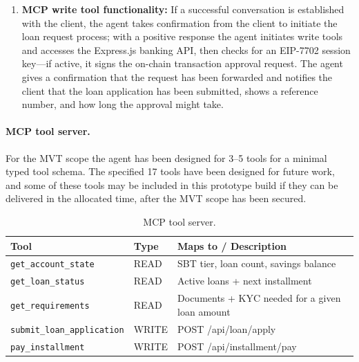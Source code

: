 \documentclass[12pt,a4paper]{report}
\newcommand{\tableheadcolor}{\rowcolor{TableHeadBg}}
\begin{document}
\begin{enumerate}[noitemsep]
\item \textbf{MCP write tool functionality:} If a successful conversation is established with the client, the agent takes confirmation from the client to initiate the loan request process; with a positive response the agent initiates write tools and accesses the Express.js banking API, then checks for an EIP-7702 session key---if active, it signs the on-chain transaction approval request. The agent gives a confirmation that the request has been forwarded and notifies the client that the loan application has been submitted, shows a reference number, and how long the approval might take.
\end{enumerate}

\paragraph{MCP tool server.} For the MVT scope the agent has been designed for 3--5 tools for a minimal typed tool schema. The specified 17 tools have been designed for future work, and some of these tools may be included in this prototype build if they can be delivered in the allocated time, after the MVT scope has been secured.

\begin{table}[H]
\centering
\caption[MCP tool server]{MCP tool server.}
\label{tab:mcp-tools}
\begin{tabular}{p{4.8cm}p{1.4cm}p{6.3cm}}
\toprule
\tableheadcolor
\textbf{Tool} & \textbf{Type} & \textbf{Maps to / Description} \\
\midrule
\texttt{get\_account\_state}       & READ & SBT tier, loan count, savings balance \\
\texttt{get\_loan\_status}         & READ & Active loans + next installment \\
\texttt{get\_requirements}         & READ & Documents + KYC needed for a given loan amount \\
\texttt{submit\_loan\_application} & WRITE & POST /api/loan/apply \\
\texttt{pay\_installment}          & WRITE & POST /api/installment/pay \\
\bottomrule
\end{tabular}
\end{table}
\end{document}
